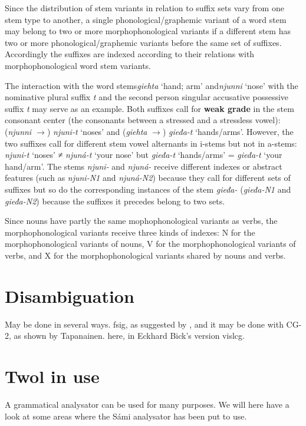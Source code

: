 \documentclass[a4paper,english]{article}
\begin{document}
Since the distribution of stem variants in relation to suffix sets vary from one stem type to another, a single phonological/graphemic variant of a word stem may belong to two or more morphophonological variants if a different stem has two or more phonological/graphemic variants before the same set of suffixes. Accordingly the suffixes are indexed according to their relations with morphophonological word stem variants. 

The interaction with the word stems\textit{giehta} ‘hand; arm’ and\textit{njunni} ‘nose’ with the nominative plural suffix \textit{­t} and the second person singular accusative possessive suffix \textit{­t} may serve as an example. Both suffixes call for \textbf{weak grade} in the stem consonant center (the consonants between a stressed and a stressless vowel): (\textit{njunni $\rightarrow$}) \textit{njuni-t} ‘noses’ and (\textit{giehta} $\rightarrow$)\textit{ gieđa-t} ‘hands/arms’. However, the two suffixes call for different stem vowel alternants in i-stems but not in a-stems: \textit{njuni-t} ‘noses’ ≠ \textit{njuná-t} ‘your nose’ but \textit{gieđa-t} ‘hands/arms’ = \textit{gieđa-t} ‘your hand/arm’. The stems \textit{njuni-} and \textit{njuná-} receive different indexes or abstract features (such as \textit{njuni-N1} and \textit{njuná-N2}) because they call for different sets of suffixes but so do the corresponding instances of the stem \textit{gieđa-} (\textit{gieđa-N1} and \textit{gieđa-N2}) because the suffixes it precedes belong to two sets. 

Since nouns have partly the same mophophonological variants as verbs, the morphophonological variants receive three kinds of indexes: N for the morphophonological variants of nouns, V for the morphophonological variants of verbs, and X for the morphophonological variants shared by nouns and verbs.

\section{Disambiguation}\label{disamb}

May be done in several ways. fsig, as suggested by \cite{Koskenniemi89}, and it may be done with CG-2, as shown by Tapanainen. here, in Eckhard Bick's version vislcg.


\section{Twol in use}

A grammatical analysator can be used for many purposes. We will here have a look at some areas where the Sámi analysator has been put to use.
\end{document}
